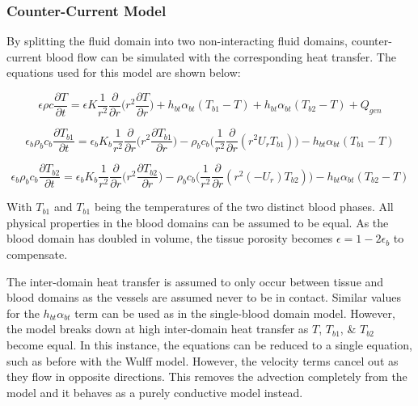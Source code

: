 \documentclass[11pt,english,a4paper,twoside,openright]{report}
\begin{document}
{{{{{{{{\subsubsection{Counter-Current Model}

By splitting the fluid domain into two non-interacting fluid domains, counter-current blood flow can be simulated with the corresponding heat transfer. The equations used for this model are shown below:

\begin{equation}
\epsilon\rho c\frac{\partial T}{\partial t} = \epsilon K\frac{1}{r^{2}}\frac{\partial}{\partial r}\bigg(r^{2}\frac{\partial T}{\partial r}\bigg) + h_{bt}\alpha_{bt}(T_{b1}-T) + h_{bt}\alpha_{bt}(T_{b2}-T) + Q_{gen}
\label{Eq:TissueSphericalXR}
\end{equation}

\begin{equation}
\epsilon_{b}\rho_{b}c_{b}\frac{\partial T_{b1}}{\partial t} = \epsilon_{b}K_{b}\frac{1}{r^{2}}\frac{\partial}{\partial r}\bigg(r^{2}\frac{\partial T_{b1}}{\partial r}\bigg)-\rho_{b}c_{b}\bigg(\frac{1}{r^{2}}\frac{\partial}{\partial r}(r^{2}U_{r}T_{b1}) \bigg)-h_{bt}\alpha_{bt}(T_{b1}-T)
\label{Eq:BloodSphericalXR1}
\end{equation}

\begin{equation}
\epsilon_{b}\rho_{b}c_{b}\frac{\partial T_{b2}}{\partial t} = \epsilon_{b}K_{b}\frac{1}{r^{2}}\frac{\partial}{\partial r}\bigg(r^{2}\frac{\partial T_{b2}}{\partial r}\bigg)-\rho_{b}c_{b}\bigg(\frac{1}{r^{2}}\frac{\partial}{\partial r}(r^{2}(-U_{r})T_{b2}) \bigg)-h_{bt}\alpha_{bt}(T_{b2}-T)
\label{Eq:BloodSphericalXR2}
\end{equation}

With $T_{b1}$ and $T_{b1}$ being the temperatures of the two distinct blood phases. All physical properties in the blood domains can be assumed to be equal. As the blood domain has doubled in volume, the tissue porosity becomes $\epsilon = 1 - 2\epsilon_{b}$ to compensate. 

The inter-domain heat transfer is assumed to only occur between tissue and blood domains as the vessels are assumed never to be in contact. Similar values for the $h_{bt}\alpha_{bt}$ term can be used as in the single-blood domain model. However, the model breaks down at high inter-domain heat transfer as $T$, $T_{b1}$, \& $T_{b2}$ become equal. In this instance, the equations can be reduced to a single equation, such as before with the Wulff model. However, the velocity terms cancel out as they flow in opposite directions. This removes the advection completely from the model and it behaves as a purely conductive model instead. 

}}}}}}}}
\end{document}
